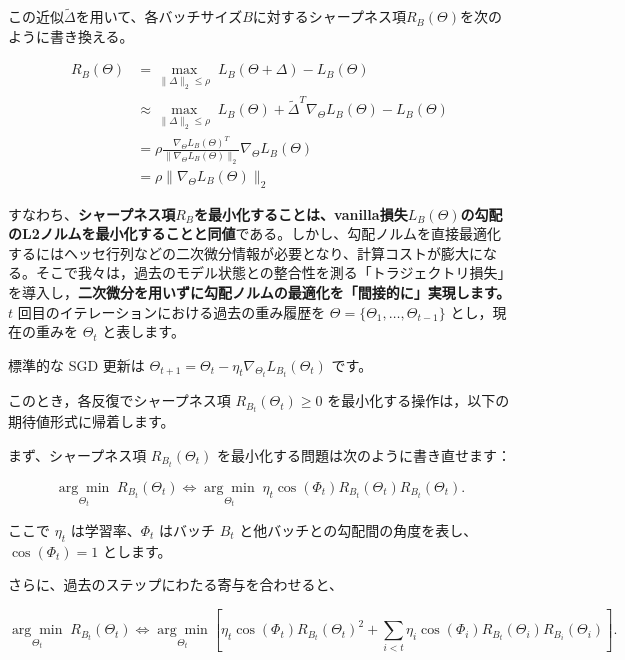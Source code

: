 \documentclass[11pt,a4paper]{article}
\begin{document}
この近似$\tilde{\Delta}$を用いて、各バッチサイズ$B$に対するシャープネス項$R_B(\Theta)$を次のように書き換える。

\begin{align*}
    R_B(\Theta) &= \underset{\|\Delta\|_2 \le \rho}{\max} \; L_B(\Theta + \Delta) - L_B(\Theta) \\
    & \approx \underset{\|\Delta\|_2 \le \rho}{\max} \; L_B(\Theta) + \tilde{\Delta}^T \nabla_\Theta L_B(\Theta) - L_B(\Theta) \\
    &= \rho \frac{\nabla_\Theta L_B(\Theta)^T}{\|\nabla_\Theta L_B(\Theta)\|_2} \nabla_\Theta L_B(\Theta) \\ 
    &= \rho \|\nabla_\Theta L_B(\Theta)\|_2
\end{align*}

すなわち、\textbf{シャープネス項$R_B$を最小化することは、vanilla損失$L_B(\Theta)$の勾配のL2ノルムを最小化することと同値}である。しかし、勾配ノルムを直接最適化するにはヘッセ行列などの二次微分情報が必要となり、計算コストが膨大になる。そこで我々は，過去のモデル状態との整合性を測る「トラジェクトリ損失」を導入し，\textbf{二次微分を用いずに勾配ノルムの最適化を「間接的に」実現します。}
$t$ 回目のイテレーションにおける過去の重み履歴を $\Theta = \{\Theta_1, \ldots, \Theta_{t-1}\}$ とし，現在の重みを $\Theta_t$ と表します。

標準的な SGD 更新は $\Theta_{t+1} = \Theta_t - \eta_t \nabla_{\Theta_t} L_{B_t}(\Theta_t)$ です。

このとき，各反復でシャープネス項 $R_{B_t}(\Theta_t) \geq 0$ を最小化する操作は，以下の期待値形式に帰着します。

まず、シャープネス項 $R_{B_t}(\Theta_t)$ を最小化する問題は次のように書き直せます：

\begin{equation}
\underset{\Theta_t}{\arg\min} \; R_{B_t}(\Theta_t) \Longleftrightarrow \underset{\Theta_t}{\arg\min} \; \eta_t \cos(\Phi_t) R_{B_t}(\Theta_t) R_{B_t}(\Theta_t).
\end{equation}

ここで $\eta_t$ は学習率、$\Phi_t$ はバッチ $B_t$ と他バッチとの勾配間の角度を表し、$\cos(\Phi_t) = 1$ とします。

さらに、過去のステップにわたる寄与を合わせると、

\begin{equation}
\underset{\Theta_t}{\arg\min} \; R_{B_t}(\Theta_t) \Longleftrightarrow \underset{\Theta_t}{\arg\min} \left[ \eta_t \cos(\Phi_t) R_{B_t}(\Theta_t)^2 + \sum_{i < t} \eta_i \cos(\Phi_i) R_{B_t}(\Theta_i) R_{B_i}(\Theta_i) \right].
\end{equation}
\end{document}
